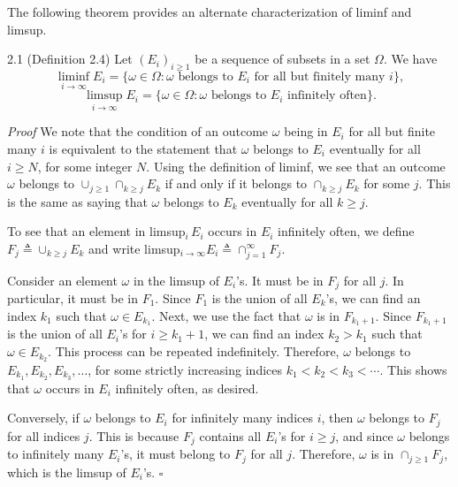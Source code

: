 The following theorem provides an alternate characterization of liminf and limsup.

\begin{thmbox}{2.1 (Definition 2.4)}
Let $(E_i)_{i\ge 1}$ be a sequence of subsets in a set $\Omega$. We have
\[
\liminf_{i\to\infty} E_i
=
\{\omega\in \Omega : \omega \text{ belongs to } E_i \text{ for all but finitely many } i\},
\]
\[
\limsup_{i\to\infty} E_i
=
\{\omega\in \Omega : \omega \text{ belongs to } E_i \text{ infinitely often}\}.
\]
\end{thmbox}

\textit{Proof} We note that the condition of an outcome $\omega$ being in $E_i$ for all but finite many $i$ is equivalent to the statement that $\omega$ belongs to $E_i$ eventually for all $i\ge N$, for some integer $N$. Using the definition of liminf, we see that an outcome $\omega$ belongs to $\cup_{j\ge 1}\cap_{k\ge j} E_k$ if and only if it belongs to $\cap_{k\ge j} E_k$ for some $j$. This is the same as saying that $\omega$ belongs to $E_k$ eventually for all $k\ge j$.

To see that an element in limsup$_i\, E_i$ occurs in $E_i$ infinitely often, we define $F_j\triangleq \cup_{k\ge j} E_k$ and write limsup$_{i\to\infty} E_i \triangleq \cap_{j=1}^{\infty} F_j$.

Consider an element $\omega$ in the limsup of $E_i$'s. It must be in $F_j$ for all $j$. In particular, it must be in $F_1$. Since $F_1$ is the union of all $E_k$'s, we can find an index $k_1$ such that $\omega\in E_{k_1}$. Next, we use the fact that $\omega$ is in $F_{k_1+1}$. Since $F_{k_1+1}$ is the union of all $E_i$'s for $i\ge k_1+1$, we can find an index $k_2>k_1$ such that $\omega\in E_{k_2}$. This process can be repeated indefinitely. Therefore, $\omega$ belongs to $E_{k_1},E_{k_2},E_{k_3},\dots$, for some strictly increasing indices $k_1<k_2<k_3<\cdots$. This shows that $\omega$ occurs in $E_i$ infinitely often, as desired.

Conversely, if $\omega$ belongs to $E_i$ for infinitely many indices $i$, then $\omega$ belongs to $F_j$ for all indices $j$. This is because $F_j$ contains all $E_i$'s for $i\ge j$, and since $\omega$ belongs to infinitely many $E_i$'s, it must belong to $F_j$ for all $j$. Therefore, $\omega$ is in $\cap_{j\ge 1} F_j$, which is the limsup of $E_i$'s. \hfill $\square$
